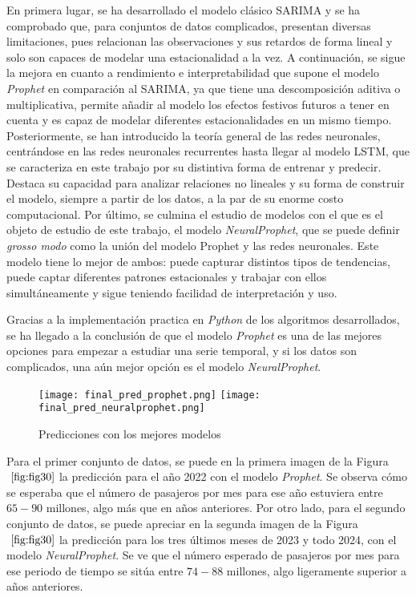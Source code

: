 \documentclass[12pt,twoside]{article}
\begin{document}
En primera lugar, se ha desarrollado el modelo clásico SARIMA y se ha comprobado que, para conjuntos de datos complicados, presentan diversas limitaciones, pues relacionan las observaciones y sus retardos de forma lineal y solo son capaces de modelar una estacionalidad a la vez. A continuación, se sigue la mejora en cuanto a rendimiento e interpretabilidad que supone el modelo \textit{Prophet} en comparación al SARIMA, ya que tiene una descomposición aditiva o multiplicativa, permite añadir al modelo los efectos festivos futuros a tener en cuenta  y es capaz de modelar diferentes estacionalidades en un mismo tiempo. Posteriormente, se han introducido la teoría general de las redes neuronales, centrándose en las redes neuronales recurrentes hasta llegar al modelo LSTM, que se caracteriza en este trabajo por su distintiva forma de entrenar y predecir. Destaca su capacidad para analizar relaciones no lineales y su forma de construir el modelo, siempre a partir de los datos, a la par de su enorme costo computacional. Por último, se culmina el estudio de modelos  con el que es el objeto de estudio de este trabajo, el modelo \textit{NeuralProphet}, que se puede definir \textit{grosso modo} como la unión del modelo Prophet y las redes neuronales. Este modelo tiene lo mejor de ambos: puede capturar distintos tipos de tendencias, puede captar diferentes patrones estacionales y trabajar con ellos simultáneamente y sigue teniendo facilidad de interpretación y uso.

Gracias a la implementación practica en \textit{Python} de los algoritmos desarrollados, se ha llegado a la conclusión de que el modelo \textit{Prophet} es una de las mejores opciones para empezar a estudiar una serie temporal, y si los datos son complicados, una aún mejor opción es el modelo \textit{NeuralProphet}. 


\begin{figure}[h]
    \centering
    \texttt{[image: final\_pred\_prophet.png]}
    \texttt{[image: final\_pred\_neuralprophet.png]}
    \caption{Predicciones con los mejores modelos} 
    \label{fig:fig30}
\end{figure}

Para el primer conjunto de datos, se puede en la primera imagen de la Figura $~\ref{fig:fig30}$ la predicción para el año 2022 con el modelo \textit{Prophet}. Se observa cómo se esperaba que el número de pasajeros por mes para ese año estuviera entre $65-90$ millones, algo más que en años anteriores. Por otro lado, para el segundo conjunto de datos, se puede apreciar en la segunda imagen de la Figura $~\ref{fig:fig30}$ la predicción para los tres últimos meses de 2023 y todo 2024, con el modelo \textit{NeuralProphet}. Se ve que el número esperado de pasajeros por mes para ese periodo de tiempo se sitúa entre $74-88$ millones, algo ligeramente superior a años anteriores.
\end{document}
